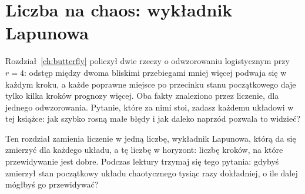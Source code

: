 
\chapter{Liczba na chaos: wykładnik Lapunowa}
\label{ch:lyapunov}

\noindent
Rozdział~\ref{ch:butterfly} policzył dwie rzeczy o odwzorowaniu logistycznym
przy $r = 4$: odstęp między dwoma bliskimi przebiegami mniej więcej podwaja
się w każdym kroku, a każde poprawne miejsce po przecinku stanu początkowego
daje tylko kilka kroków prognozy więcej. Oba fakty znaleziono przez liczenie,
dla jednego odwzorowania. Pytanie, które za nimi stoi, zadasz każdemu
układowi w tej książce: jak szybko rosną małe błędy i jak daleko naprzód
pozwala to widzieć?

Ten rozdział zamienia liczenie w jedną liczbę, wykładnik Lapunowa, którą da
się zmierzyć dla każdego układu, a tę liczbę w horyzont: liczbę kroków, na
które przewidywanie jest dobre. Podczas
lektury trzymaj się tego pytania: gdybyś zmierzył stan początkowy układu
chaotycznego tysiąc razy dokładniej, o ile dalej mógłbyś go przewidywać?

\begin{outcomes}
\end{outcomes}

